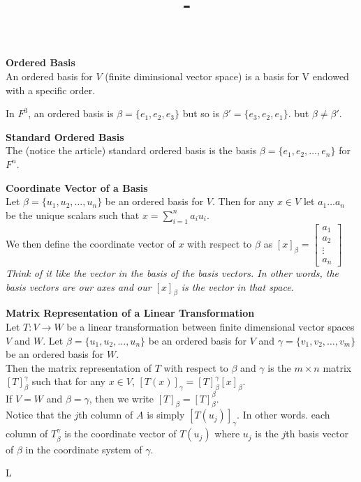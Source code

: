 \documentclass[answers,12pt,addpoints]{exam}
\author{\name}
\title{\course \ - \assignment}
\begin{document}
\maketitle

\begin{definition}
    \textbf{Ordered Basis}\\
    An ordered basis for $V$ (finite diminsional vector space) is a basis for V endowed with a specific order.
    \begin{example}
        In $F^3$, an ordered basis is $\beta = \{e_1, e_2, e_3\}$ but so is $\beta' = \{e_3, e_2, e_1\}$. but $\beta \neq \beta'$.
    \end{example}
\end{definition}

\begin{definition}
    \textbf{Standard Ordered Basis}\\
    The (notice the article) standard ordered basis is the basis $\beta = \{e_1, e_2, \dots, e_n\}$ for $F^n$.
\end{definition}

\begin{definition}
    \textbf{Coordinate Vector of a Basis}\\
    Let $\beta = \{u_1, u_2, \dots, u_n\}$ be an ordered basis for $V$. Then for any $x \in V$ let $a_1 ... a_n$ be the unique scalars such that $x = \sum_{i=1}^{n} a_iu_i$. \\
    We then define the coordinate vector of $x$ with respect to $\beta$ as $[x]_{\beta} = \begin{bmatrix} a_1 \\ a_2 \\ \vdots \\ a_n \end{bmatrix}$\\
    \textit{Think of it like the vector in the basis of the basis vectors. In other words, the basis vectors are our axes and our $[x]_\beta$ is the vector in that space.}
\end{definition}

\begin{definition}
    \textbf{Matrix Representation of a Linear Transformation}\\
    Let $T: V \to W$ be a linear transformation between finite dimensional vector spaces $V$ and $W$. Let $\beta = \{u_1, u_2, \dots, u_n\}$ be an ordered basis for $V$ and $\gamma = \{v_1, v_2, \dots, v_m\}$ be an ordered basis for $W$.\\
    Then the matrix representation of $T$ with respect to $\beta$ and $\gamma$ is the $m \times n$ matrix $[T]_{\beta}^{\gamma}$ such that for any $x \in V$, $[T(x)]_{\gamma} = [T]_{\beta}^{\gamma}[x]_{\beta}$.\\
    If $V = W$ and $\beta = \gamma$, then we write $[T]_{\beta} = [T]_{\beta}^{\beta}$.\\
    Notice that the $j$th column of $A$ is simply $[T(u_j)]_{\gamma}$. In other words. each column of $T_{\beta}^{\gamma}$ is the coordinate vector of $T(u_j)$ where $u_j$ is the $j$th basis vector of $\beta$ in the coordinate system of $\gamma$.
\end{definition}

\begin{definition}
    L
\end{definition}
\end{document}
